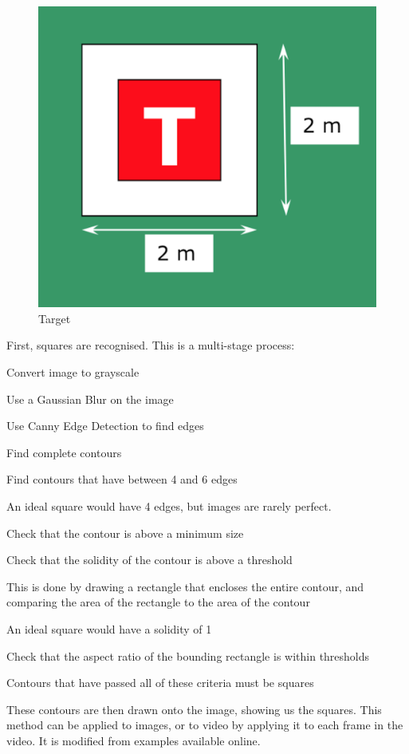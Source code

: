\documentclass[11pt]{article}
\begin{document}
\begin{figure}
    \begin{center}
        \includegraphics[width=0.48\linewidth]{IMechE_target}
        \caption{Target \cite{IMechE_rules}}
        \label{fig:target}
    \end{center}
\end{figure}

First, squares are recognised. This is a multi-stage process:
\begin{compactenum}
    \item Convert image to grayscale
    \item Use a Gaussian Blur on the image
    \item Use Canny Edge Detection to find edges
    \item Find complete contours
    \item Find contours that have between 4 and 6 edges
    \begin{compactitem}
        \item \small An ideal square would have 4 edges, but images are rarely perfect.
    \end{compactitem}
    \item Check that the contour is above a minimum size
    \item Check that the solidity of the contour is above a threshold
    \begin{compactitem}
        \item This is done by drawing a rectangle that encloses the entire contour, and comparing the area of the rectangle to the area of the contour
        \item An ideal square would have a solidity of 1
    \end{compactitem}
    \item Check that the aspect ratio of the bounding rectangle is within thresholds
    \item Contours that have passed all of these criteria must be squares
\end{compactenum}
These contours are then drawn onto the image, showing us the squares. This method can be applied to images, or to video by applying it to each frame in the video. It is modified from examples available online.\cite{opencv_tutorials}\cite{pyimagesearch_squares}
\end{document}
